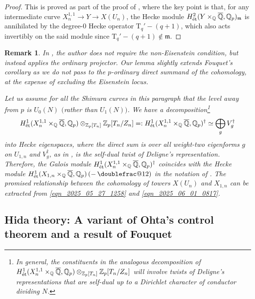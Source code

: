 \documentclass{amsart}
\makeatletter
\newlength{\doublefracgap}
\DeclareRobustCommand{\doublefrac}[2]{%
  \mathinner{\mathpalette\doublefrac@{{#1}{#2}}}%
}
\newcommand{\doublefrac@}[2]{\doublefrac@@#1#2}
\newcommand{\doublefrac@@}[3]{%
  \ooalign{%
    \raisebox{\doublefracgap}{$\m@th#1\frac{#2}{\phantom{#3}}$}\cr
    \raisebox{-\doublefracgap}{$\m@th#1\frac{\phantom{#2}}{#3}$}\cr
  }%
}
\numberwithin{equation}{section}
\newtheorem{remark}[theorem]{Remark}
\newcommand{\QQ}{\mathbb{Q}}
\newcommand{\Qp}{{\mathbb{Q}_p}}
\newcommand{\ZZ}{\mathbb{Z}}
\newcommand{\etale}{\textup{\'et}}
\newcommand{\m}{\mathfrak{m}}
\newcommand{\Q}{\QQ}
\makeatother
\begin{document}
\begin{proof}
         This is proved as part of the proof of \cite[Corollary 3.2]{Fouquet2013}, where the key point is that, for any intermediate curve $X_n^{1,1}\to Y\to X(U_n)$, the Hecke module $H^2_\etale(Y\times_{\QQ} \overline{\Q},\Qp)_\m$ is annihilated by the degree-0 Hecke operator $\mathrm{T}_q'-(q+1)$, which also acts invertibly on the said module since $\mathrm{T}_q'-(q+1)\not\in\m$. 
\end{proof}


\begin{remark}
\item[i)] In \cite{Fouquet2013}, the author does not require the non-Eisenstein condition, but instead applies the ordinary projector. Our lemma slightly extends Fouquet's corollary as we do not pass to the $p$-ordinary direct summand of the cohomology, at the expense of excluding the Eisenstein locus.
\item[ii)] Let us assume for all the Shimura curves in this paragraph that the level away from $p$ is $U_0(N)$ $($rather than $U_1(N)$$)$. We have a decomposition\footnote{In general, the constituents in the analogous decomposition of $H^1_\etale(X_{n}^{1,1} \times_{\QQ} \overline{\Q},\Qp) \otimes_{\ZZ_p[T_n]} \ZZ_p[T_n/Z_n]$ will involve twists of Deligne's representations that are self-dual up to a Dirichlet character of conductor dividing $N$.} 
$$H^1_\etale(X_{n}^{1,1} \times_{\QQ} \overline{\Q},\Qp) \otimes_{\ZZ_p[T_n]} \ZZ_p[T_n/Z_n]=:H^1_\etale(X_{n}^{1,1} \times_{\QQ} \overline{\Q},\Qp)^\dagger\simeq \bigoplus_g V_g^\dagger$$ 
into Hecke eigenspaces, where the direct sum is over all weight-two eigenforms $g$ on $U_{1,n}$ and $V_g^\dagger$, as in \cite{howard2007}, is the self-dual twist of Deligne's representation.  Therefore, the Galois module $H^1_\etale(X_{n}^{1,1} \times_{\QQ} \overline{\Q},\Qp)^\dagger$ coincides with the Hecke module $H^1_\etale(X_{1,n} \times_{\QQ} \overline{\Q},\Qp)\left(-\doublefrac{1}{2}\right)$ in the notation of \cite{DarmonRotger}. %
The promised relationship between the cohomology of towers $X(U_n)$ and $X_{1,n}$ can be extracted from \eqref{eqn_2025_05_27_1258} and \eqref{eqn_2025_06_01_0817}.
\end{remark}






\subsection{Hida theory: A variant of Ohta's control theorem and a result of Fouquet}
\end{document}
